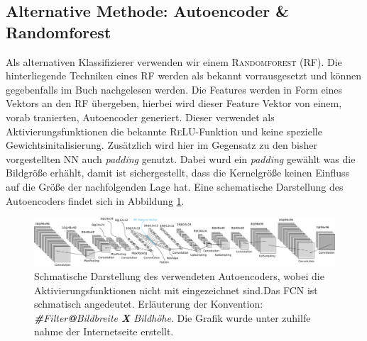 \subsection{Alternative Methode: Autoencoder \& Randomforest}
Als alternativen Klassifizierer verwenden wir einem \textsc{Randomforest} (RF).
Die hinterliegende Techniken eines RF werden als bekannt vorrausgesetzt und können
gegebenfalls im Buch \cite[S. 181]{hands_on_machine_learning} nachgelesen werden.
Die Features werden in Form eines Vektors an den RF übergeben,
hierbei wird dieser Feature Vektor von einem, vorab tranierten,
Autoencoder generiert. Dieser verwendet als Aktivierungsfunktionen
die bekannte \textsc{ReLU}-Funktion und keine spezielle Gewichtsinitalisierung.
Zusätzlich wird hier im Gegensatz zu den bisher vorgestellten NN auch \emph{padding}
genutzt. Dabei wurd ein \emph{padding} gewählt was
die Bildgröße erhählt, damit ist sichergestellt, dass die Kernelgröße keinen Einfluss
auf die Größe der nachfolgenden Lage hat. Eine schematische Darstellung des Autoencoders
findet sich in Abbildung \ref{fig:Autoencoder}.
\begin{figure}
\centering
\includegraphics[width=\the\textwidth]{../../final_data/general/autoencoder.pdf}
\caption{Schmatische Darstellung des verwendeten Autoencoders, wobei
         die Aktivierungsfunktionen nicht mit eingezeichnet sind.Das FCN
         ist schmatisch angedeutet. Erläuterung der Konvention: \emph{\textbf{\#}Filter\textbf{@}Bildbreite \textbf{X} Bildhöhe}.
         Die Grafik wurde unter zuhilfe nahme der Internetseite \cite{net_svg_source} erstellt.}
\label{fig:Autoencoder}
\end{figure}
